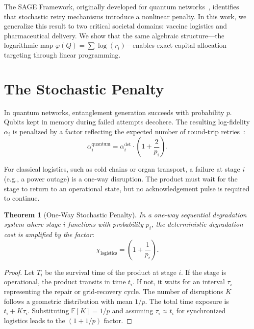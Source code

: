 \documentclass[aps,pra,reprint,amsmath,amssymb,superscriptaddress]{revtex4-2}
\newtheorem{theorem}{Theorem}
\begin{document}
The SAGE Framework, originally developed for quantum networks~\cite{flett2026}, identifies that stochastic retry mechanisms introduce a nonlinear penalty. In this work, we generalize this result to two critical societal domains: vaccine logistics and pharmaceutical delivery. We show that the same algebraic structure---the logarithmic map $\varphi(Q) = \sum \log(r_i)$---enables exact capital allocation targeting through linear programming.


\section{The Stochastic Penalty}

In quantum networks, entanglement generation succeeds with probability $p$. Qubits kept in memory during failed attempts decohere. The resulting log-fidelity $\alpha_i$ is penalized by a factor reflecting the expected number of round-trip retries~\cite{flett2026}:
\begin{equation}
\alpha_i^{\text{quantum}} = \alpha_i^{\text{det}} \cdot \left(1 + \frac{2}{p_i}\right) .
\end{equation}

For classical logistics, such as cold chains or organ transport, a failure at stage $i$ (e.g., a power outage) is a one-way disruption. The product must wait for the stage to return to an operational state, but no acknowledgement pulse is required to continue.

\begin{theorem}[One-Way Stochastic Penalty]
In a one-way sequential degradation system where stage $i$ functions with probability $p_i$, the deterministic degradation cost is amplified by the factor:
\begin{equation}
\chi_{\text{logistics}} = \left( 1 + \frac{1}{p_i} \right) .
\end{equation}
\end{theorem}

\begin{proof}
Let $T_i$ be the survival time of the product at stage $i$. If the stage is operational, the product transits in time $t_i$. If not, it waits for an interval $\tau_i$ representing the repair or grid-recovery cycle. The number of disruptions $K$ follows a geometric distribution with mean $1/p$. The total time exposure is $t_{i} + K\tau_i$. Substituting $\mathbb{E}[K] = 1/p$ and assuming $\tau_i \approx t_i$ for synchronized logistics leads to the $(1 + 1/p)$ factor.
\end{proof}
\end{document}
